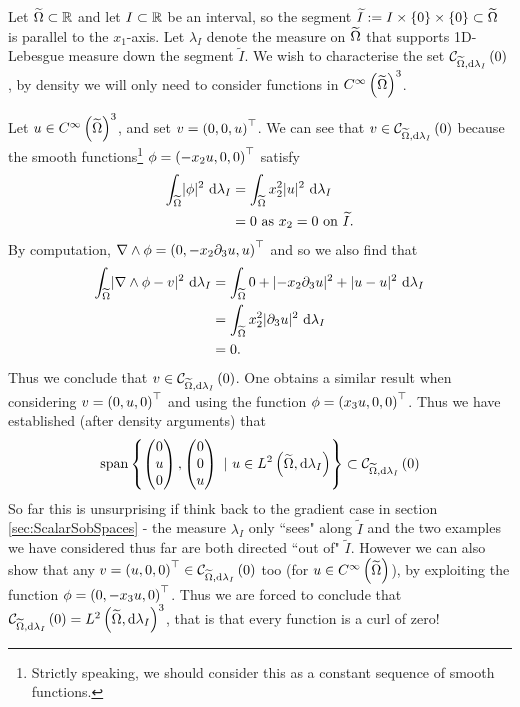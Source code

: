 Let $\widetilde{\Omega}\subset\mathbb{R}$ and let $I\subset\mathbb{R}$ be an interval, so the segment $\widetilde{I} := I\times\left\{ 0 \right\}\times\left\{ 0 \right\}\subset\widetilde{\Omega}$ is parallel to the $x_1$-axis.
Let $\lambda_I$ denote the measure on $\widetilde{\Omega}$ that supports 1D-Lebesgue measure down the segment $\widetilde{I}$.
We wish to characterise the set $\mathcal{C}_{ \widetilde{\Omega}, \mathrm{d}\lambda_I}\left( 0 \right)$, by density we will only need to consider functions in $C^{\infty}\left( \widetilde{\Omega} \right)^3$. \newline

Let $u\in C^{\infty}\left( \widetilde{\Omega} \right)^3$, and set $v = \left( 0,0,u \right)^{\top}$.
We can see that $v\in\mathcal{C}_{ \widetilde{\Omega}, \mathrm{d}\lambda_I}\left( 0 \right)$ because the smooth functions\footnote{Strictly speaking, we should consider this as a constant sequence of smooth functions.} $\phi = \left( -x_2 u, 0, 0 \right)^{\top}$ satisfy
\begin{align*}
	\int_{\widetilde{\Omega}}\lvert \phi \rvert^2 \ \mathrm{d}\lambda_I &= \int_{\widetilde{\Omega}}x_2^2\lvert u \rvert^2 \ \mathrm{d}\lambda_I \\
	&= 0 \text{ as } x_2=0 \text{ on } \widetilde{I}.
\end{align*}
By computation, $\nabla\wedge\phi = \left( 0, -x_2\partial_3 u, u \right)^{\top}$ and so we also find that
\begin{align*}
	\int_{\widetilde{\Omega}}\lvert \nabla\wedge\phi - v \rvert^2 \ \mathrm{d}\lambda_I
	&= \int_{\widetilde{\Omega}}0 + \lvert -x_2\partial_3 u \rvert^2 + \lvert u-u \rvert^2 \ \mathrm{d}\lambda_I \\
	&= \int_{\widetilde{\Omega}}x_2^2\lvert \partial_3 u \rvert^2 \ \mathrm{d}\lambda_I \\
	&= 0.
\end{align*}
Thus we conclude that $v\in\mathcal{C}_{ \widetilde{\Omega}, \mathrm{d}\lambda_I}\left( 0 \right)$.
One obtains a similar result when considering $v=\left( 0, u, 0 \right)^{\top}$ and using the function $\phi = \left( x_3 u, 0 , 0 \right)^{\top}$.
Thus we have established (after density arguments) that
\begin{align*}
	 \mathrm{span}\left\{ 
	 \begin{pmatrix} 0 \\ u \\ 0 \end{pmatrix}, \begin{pmatrix} 0 \\ 0 \\ u \end{pmatrix}
	 \ \vert \ u\in L^{2}\left( \widetilde{\Omega},\mathrm{d}\lambda_I \right)
	  \right\}\subset \mathcal{C}_{ \widetilde{\Omega}, \mathrm{d}\lambda_I}\left( 0 \right)
\end{align*}
So far this is unsurprising if think back to the gradient case in section \ref{sec:ScalarSobSpaces} - the measure $\lambda_I$ only ``sees" along $\widetilde{I}$ and the two examples we have considered thus far are both directed ``out of" $\widetilde{I}$.
However we can also show that any $v=\left( u,0,0 \right)^{\top}\in\mathcal{C}_{ \widetilde{\Omega}, \mathrm{d}\lambda_I}\left( 0 \right)$ too (for $u\in C^{\infty}\left( \widetilde{\Omega} \right)$), by exploiting the function $\phi=\left( 0,-x_3 u,0 \right)^\top$.
Thus we are forced to conclude that $\mathcal{C}_{ \widetilde{\Omega}, \mathrm{d}\lambda_I}\left( 0 \right) = L^{2}\left( \widetilde{\Omega},\mathrm{d}\lambda_I \right)^3$, that is that every function is a curl of zero! \newline

